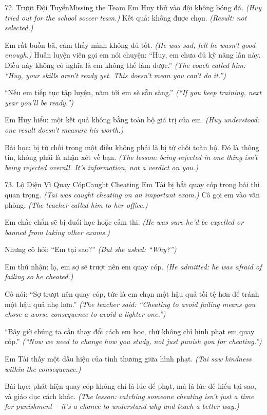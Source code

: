 \begin{truyen}{72. Trượt Đội Tuyển}{Missing the Team}
Em Huy thử vào đội không bóng đá.
\textit{(Huy tried out for the school soccer team.)}
Kết quả: không được chọn.
\textit{(Result: not selected.)}

Em rất buồn bã, cảm thấy mình không đủ tốt.
\textit{(He was sad, felt he wasn't good enough.)}
Huấn luyện viên gọi em nói chuyện: ``Huy, em chưa đủ kỹ năng lần này. Điều này không có nghĩa là em không thể làm được.''
\textit{(The coach called him: ``Huy, your skills aren't ready yet. This doesn't mean you can't do it.'')}

``Nếu em tiếp tục tập luyện, năm tới em sẽ sẵn sàng.''
\textit{(``If you keep training, next year you'll be ready.'')}

Em Huy hiểu: một kết quả không bằng toàn bộ giá trị của em.
\textit{(Huy understood: one result doesn't measure his worth.)}

Bài học: bị từ chối trong một điều không phải là bị từ chối toàn bộ. Đó là thông tin, không phải là nhận xét về bạn.
\textit{(The lesson: being rejected in one thing isn't being rejected overall. It's information, not a verdict on you.)}
\end{truyen}

\begin{truyen}{73. Lộ Diện Vì Quay Cóp}{Caught Cheating}
Em Tài bị bắt quay cóp trong bài thi quan trọng.
\textit{(Tai was caught cheating on an important exam.)}
Cô gọi em vào văn phòng.
\textit{(The teacher called him to her office.)}

Em chắc chắn sẽ bị đuổi học hoặc cấm thi.
\textit{(He was sure he'd be expelled or banned from taking other exams.)}

Nhưng cô hỏi: ``Em tại sao?''
\textit{(But she asked: ``Why?'')}

Em thú nhận: lạ, em sợ sẽ trượt nên em quay cóp.
\textit{(He admitted: he was afraid of failing so he cheated.)}

Cô nói: ``Sợ trượt nên quay cóp, tức là em chọn một hậu quả tồi tệ hơn để tránh một hậu quả nhẹ hơn.''
\textit{(The teacher said: ``Cheating to avoid failing means you chose a worse consequence to avoid a lighter one.'')}

``Bây giờ chúng ta cần thay đổi cách em học, chứ không chỉ hình phạt em quay cóp.''
\textit{(``Now we need to change how you study, not just punish you for cheating.'')}

Em Tài thấy một dấu hiệu của tình thương giữa hình phạt.
\textit{(Tai saw kindness within the consequence.)}

Bài học: phát hiện quay cóp không chỉ là lúc để phạt, mà là lúc để hiểu tại sao, và giáo dục cách khác.
\textit{(The lesson: catching someone cheating isn't just a time for punishment -- it's a chance to understand why and teach a better way.)}
\end{truyen}

